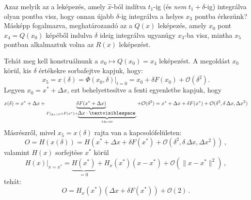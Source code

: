 Azaz melyik az a leképezés, amely $\hat{x}$-ból indítva $t_1$-ig (és \emph{nem} $t_1+\delta$-ig) integrálva olyan pontba visz, hogy onnan újabb $\delta$-ig integrálva a helyes $x_3$ pontba érkezünk? Másképp fogalmazva, meghatározandó az a $Q(x)$ leképezés, amely $x_0$ pont $x_4=Q(x_0)$ képéből indulva $\delta$ ideig integrálva ugyanúgy $x_3$-ba visz, mintha $x_5$ pontban alkalmaztuk volna az $R(x)$ leképezést.
\par Tehát meg kell konstruálnunk a $x_0\mapsto Q(x_0)=x_4$ leképezést.
A megoldást $x_0$ körül, kis $\delta$ értékekre sorbafejtve kapjuk, hogy:
%
\begin{equation}
x_5=x(\delta)=\Phi(x_0,\delta)|_{t=0}=x_0+\delta F(x_0)+\mathcal{O}(\delta^2).
\end{equation}
%
Legyen $x_0=x^*+\Delta x$, ezt behelyettesítve a fenti egyenletbe kapjuk, hogy
%
\begin{equation}
x(\delta)=x^*+\Delta x+\underbrace{\delta F(x^*+\Delta x)}_{ F|_{\Delta x=0}= F(x^*)+\underbrace{\Delta x \cdot \textvisiblespace\,}_{\delta \Delta x \approx 0} }+\mathcal{O}(\delta^2)=x^*+\Delta x+\delta F(x^*)+\mathcal{O}(\delta^2,\delta \, \Delta x, \Delta x^2)
\end{equation}
Másrészről, mivel $x_5=x(\delta)$ rajta van a kapcsolófelületen:
%
\begin{equation}
O=H(x(\delta))=H(x^*+\Delta x+\delta F(x^*)+\mathcal{O}(\delta^2,\delta \, \Delta x, \Delta x^2))\,,
\end{equation}
%
valamint $H(x)$ sorfejtése $x^*$ körül 
%
\begin{equation}
H(x)|_{x=x^*}=\underbrace{H(x^*)}_{=0}+H_x(x^*)(x-x^*)+\mathcal{O}(\|{x-x^*}\|^2)\,,
\end{equation}
tehát:
\begin{equation}
O=H_x(x^*)(\Delta x+\delta F(x^*))+\mathcal{O}(2)\,.
\end{equation}

